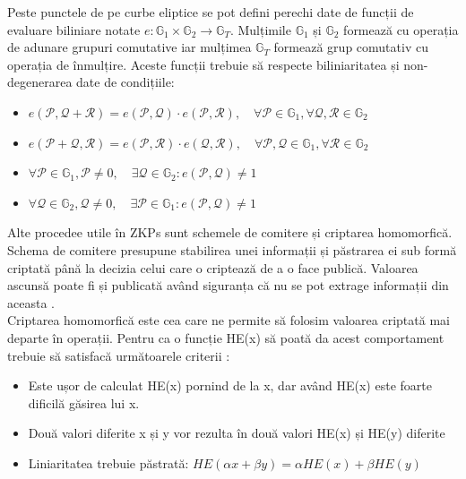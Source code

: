 Peste punctele de pe curbe eliptice se pot defini perechi date de funcții de evaluare biliniare notate $e: \mathbb{G}_1 \times \mathbb{G}_2 \rightarrow \mathbb{G}_T$. Mulțimile $\mathbb{G}_1$ și $\mathbb{G}_2$ formează cu operația de adunare grupuri comutative iar mulțimea $\mathbb{G}_T$ formează grup comutativ cu operația de înmulțire. Aceste funcții trebuie să respecte biliniaritatea și non-degenerarea date de condițiile:
\begin{itemize}
    \item $e(\mathcal{P},\mathcal{Q} + \mathcal{R}) = e(\mathcal{P},\mathcal{Q}) \cdot e(\mathcal{P},\mathcal{R}), \quad \forall \mathcal{P} \in \mathbb{G}_1, \forall \mathcal{Q},\mathcal{R} \in \mathbb{G}_2$
    \item $e(\mathcal{P}+\mathcal{Q},\mathcal{R}) = e(\mathcal{P},\mathcal{R}) \cdot e(\mathcal{Q},\mathcal{R}), \quad \forall \mathcal{P},\mathcal{Q} \in \mathbb{G}_1, \forall \mathcal{R} \in \mathbb{G}_2$
    \item $\forall \mathcal{P} \in \mathbb{G}_1, \mathcal{P} \neq 0,\quad \exists \mathcal{Q} \in \mathbb{G}_2: e(\mathcal{P},\mathcal{Q}) \neq 1$
    \item $\forall \mathcal{Q} \in \mathbb{G}_2, \mathcal{Q} \neq 0,\quad \exists \mathcal{P} \in \mathbb{G}_1: e(\mathcal{P},\mathcal{Q}) \neq 1$
\end{itemize}

\clearpage

Alte procedee utile în ZKPs sunt schemele de comitere și criptarea homomorfică.\\

Schema de comitere presupune stabilirea unei informații și păstrarea ei sub formă criptată până la decizia celui care o criptează de a o face publică. Valoarea ascunsă poate fi și publicată având siguranța că nu se pot extrage informații din aceasta \cite{ZKS_Crypto_Basic}. \\

Criptarea homomorfică este cea care ne permite să folosim valoarea criptată mai departe în operații. Pentru ca o funcție HE(x) să poată da acest comportament trebuie să satisfacă următoarele criterii \cite{ZKS_Crypto_Basic}:
\begin{itemize}
    \item Este ușor de calculat HE(x) pornind de la x, dar având HE(x) este foarte dificilă găsirea lui x.
    \item Două valori diferite x și y vor rezulta în două valori HE(x) și HE(y) diferite
    \item Liniaritatea trebuie păstrată: $HE(\alpha x + \beta y) = \alpha HE(x) + \beta HE(y)$
\end{itemize}

